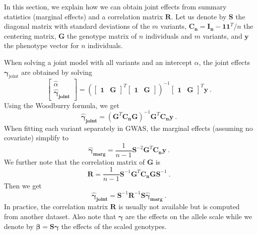 \documentclass{bioinfo}
\begin{document}
\begin{methods}
In this section, we explain how we can obtain joint effects from summary statistics (marginal effects) and a correlation matrix $\boldsymbol{R}$.
Let us denote by $\boldsymbol{S}$ the diagonal matrix with standard deviations of the $m$ variants, $\boldsymbol{C_n} = \boldsymbol{I_n} - \boldsymbol{1} \boldsymbol{1}^T / n$ the centering matrix, $\boldsymbol{G}$ the genotype matrix of $n$ individuals and $m$ variants, and $\boldsymbol{y}$ the phenotype vector for $n$ individuals.

When solving a joint model with all variants and an intercept ${\alpha}$, the joint effects $\boldsymbol{\gamma}_{\text{joint}}$ are obtained by solving
\[\begin{bmatrix} \hat{\alpha} \\ \boldsymbol{\hat{\gamma}_{\text{joint}}} \end{bmatrix} = \left(\begin{bmatrix} \boldsymbol{1} & \boldsymbol{G} \end{bmatrix}^T \begin{bmatrix} \boldsymbol{1} & \boldsymbol{G} \end{bmatrix}\right)^{-1} \begin{bmatrix} \boldsymbol{1} & \boldsymbol{G} \end{bmatrix}^T \boldsymbol{y} ~.\]
Using the Woodburry formula, we get 
\[\boldsymbol{\hat{\gamma}_{\text{joint}}} = (\boldsymbol{G}^T \boldsymbol{C_n} \boldsymbol{G})^{-1} \boldsymbol{G}^T \boldsymbol{C_n} \boldsymbol{y} ~.\]
When fitting each variant separately in GWAS, the marginal effects (assuming no covariate) simplify to 
\[\boldsymbol{\hat{\gamma}_{\text{marg}}} = \dfrac{1}{n-1} \boldsymbol{S}^{-2} \boldsymbol{G}^T \boldsymbol{C_n} \boldsymbol{y} ~.\] 
We further note that the correlation matrix of $\boldsymbol{G}$ is \[\boldsymbol{R} =  \dfrac{1}{n-1} \boldsymbol{S}^{-1} \boldsymbol{G}^T \boldsymbol{C_n} \boldsymbol{G}  \boldsymbol{S}^{-1} ~.\]
Then we get 
\begin{equation}\label{eq:joint}
\boldsymbol{\hat{\gamma}_{\text{joint}}} = \boldsymbol{S}^{-1} \boldsymbol{R}^{-1} \boldsymbol{S} \boldsymbol{\hat{\gamma}_{\text{marg}}} ~.
\end{equation}
In practice, the correlation matrix $\boldsymbol{R}$ is usually not available but is computed from another dataset. 
Also note that $\boldsymbol{\gamma}$ are the effects on the allele scale while we denote by $\boldsymbol{\beta} = \boldsymbol{S} \boldsymbol{\gamma}$ the effects of the scaled genotypes.


\end{methods}
\end{document}
